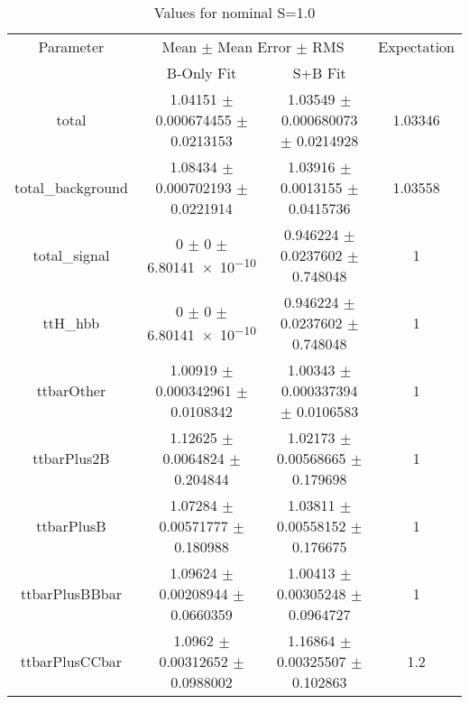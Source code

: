 \begin{table}
\centering
\caption{Values for nominal S=1.0}
\begin{tabular}{cccc}
\toprule
Parameter & \multicolumn{2}{c}{Mean $\pm$ Mean Error $\pm$ RMS} & Expectation\\
 & B-Only Fit & S+B Fit & \\
\midrule
total & \num{1.04151} $\pm$ \num{0.000674455} $\pm$ \num{0.0213153} & \num{1.03549} $\pm$ \num{0.000680073} $\pm$ \num{0.0214928} & \num{1.03346}\\
total\_background & \num{1.08434} $\pm$ \num{0.000702193} $\pm$ \num{0.0221914} & \num{1.03916} $\pm$ \num{0.0013155} $\pm$ \num{0.0415736} & \num{1.03558}\\
total\_signal & \num{0} $\pm$ \num{0} $\pm$ \num{6.80141e-10} & \num{0.946224} $\pm$ \num{0.0237602} $\pm$ \num{0.748048} & \num{1}\\
ttH\_hbb & \num{0} $\pm$ \num{0} $\pm$ \num{6.80141e-10} & \num{0.946224} $\pm$ \num{0.0237602} $\pm$ \num{0.748048} & \num{1}\\
ttbarOther & \num{1.00919} $\pm$ \num{0.000342961} $\pm$ \num{0.0108342} & \num{1.00343} $\pm$ \num{0.000337394} $\pm$ \num{0.0106583} & \num{1}\\
ttbarPlus2B & \num{1.12625} $\pm$ \num{0.0064824} $\pm$ \num{0.204844} & \num{1.02173} $\pm$ \num{0.00568665} $\pm$ \num{0.179698} & \num{1}\\
ttbarPlusB & \num{1.07284} $\pm$ \num{0.00571777} $\pm$ \num{0.180988} & \num{1.03811} $\pm$ \num{0.00558152} $\pm$ \num{0.176675} & \num{1}\\
ttbarPlusBBbar & \num{1.09624} $\pm$ \num{0.00208944} $\pm$ \num{0.0660359} & \num{1.00413} $\pm$ \num{0.00305248} $\pm$ \num{0.0964727} & \num{1}\\
ttbarPlusCCbar & \num{1.0962} $\pm$ \num{0.00312652} $\pm$ \num{0.0988002} & \num{1.16864} $\pm$ \num{0.00325507} $\pm$ \num{0.102863} & \num{1.2}\\
\bottomrule
\end{tabular}
\end{table}
